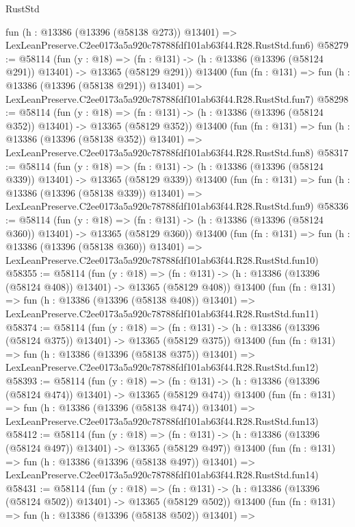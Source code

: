 \begin{lexlean}{RustStd}
\begin{coremodule}
    fun (h : @13386 (@13396 (@58138 @273)) @13401) =>
    LexLeanPreserve.C2ee0173a5a920c78788fdf101ab63f44.R28.RustStd.fun6)
@58279 := @58114
    (fun (y : @18) =>
    (fn : @131) -> (h : @13386 (@13396 (@58124 @291)) @13401) -> @13365 (@58129 @291))
    @13400
    (fun (fn : @131) =>
    fun (h : @13386 (@13396 (@58138 @291)) @13401) =>
    LexLeanPreserve.C2ee0173a5a920c78788fdf101ab63f44.R28.RustStd.fun7)
@58298 := @58114
    (fun (y : @18) =>
    (fn : @131) -> (h : @13386 (@13396 (@58124 @352)) @13401) -> @13365 (@58129 @352))
    @13400
    (fun (fn : @131) =>
    fun (h : @13386 (@13396 (@58138 @352)) @13401) =>
    LexLeanPreserve.C2ee0173a5a920c78788fdf101ab63f44.R28.RustStd.fun8)
@58317 := @58114
    (fun (y : @18) =>
    (fn : @131) -> (h : @13386 (@13396 (@58124 @339)) @13401) -> @13365 (@58129 @339))
    @13400
    (fun (fn : @131) =>
    fun (h : @13386 (@13396 (@58138 @339)) @13401) =>
    LexLeanPreserve.C2ee0173a5a920c78788fdf101ab63f44.R28.RustStd.fun9)
@58336 := @58114
    (fun (y : @18) =>
    (fn : @131) -> (h : @13386 (@13396 (@58124 @360)) @13401) -> @13365 (@58129 @360))
    @13400
    (fun (fn : @131) =>
    fun (h : @13386 (@13396 (@58138 @360)) @13401) =>
    LexLeanPreserve.C2ee0173a5a920c78788fdf101ab63f44.R28.RustStd.fun10)
@58355 := @58114
    (fun (y : @18) =>
    (fn : @131) -> (h : @13386 (@13396 (@58124 @408)) @13401) -> @13365 (@58129 @408))
    @13400
    (fun (fn : @131) =>
    fun (h : @13386 (@13396 (@58138 @408)) @13401) =>
    LexLeanPreserve.C2ee0173a5a920c78788fdf101ab63f44.R28.RustStd.fun11)
@58374 := @58114
    (fun (y : @18) =>
    (fn : @131) -> (h : @13386 (@13396 (@58124 @375)) @13401) -> @13365 (@58129 @375))
    @13400
    (fun (fn : @131) =>
    fun (h : @13386 (@13396 (@58138 @375)) @13401) =>
    LexLeanPreserve.C2ee0173a5a920c78788fdf101ab63f44.R28.RustStd.fun12)
@58393 := @58114
    (fun (y : @18) =>
    (fn : @131) -> (h : @13386 (@13396 (@58124 @474)) @13401) -> @13365 (@58129 @474))
    @13400
    (fun (fn : @131) =>
    fun (h : @13386 (@13396 (@58138 @474)) @13401) =>
    LexLeanPreserve.C2ee0173a5a920c78788fdf101ab63f44.R28.RustStd.fun13)
@58412 := @58114
    (fun (y : @18) =>
    (fn : @131) -> (h : @13386 (@13396 (@58124 @497)) @13401) -> @13365 (@58129 @497))
    @13400
    (fun (fn : @131) =>
    fun (h : @13386 (@13396 (@58138 @497)) @13401) =>
    LexLeanPreserve.C2ee0173a5a920c78788fdf101ab63f44.R28.RustStd.fun14)
@58431 := @58114
    (fun (y : @18) =>
    (fn : @131) -> (h : @13386 (@13396 (@58124 @502)) @13401) -> @13365 (@58129 @502))
    @13400
    (fun (fn : @131) =>
    fun (h : @13386 (@13396 (@58138 @502)) @13401) =>

\end{coremodule}
\end{lexlean}
